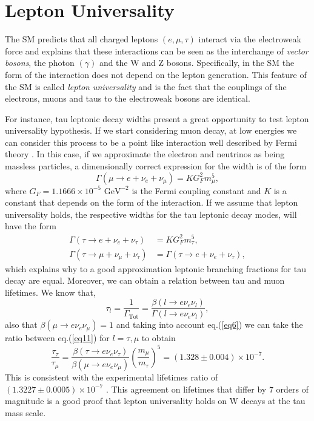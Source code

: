 \section{Lepton Universality}\label{chap2sec2}
The SM predicts that all charged leptons $(e,\mu,\tau)$ interact via the electroweak force and explains that these interactions can be seen as the interchange of \textit{vector bosons}, the photon $(\gamma)$ and the W and Z bosons. Specifically, in the SM the form of the interaction does not depend on the lepton generation. This feature of the SM is called \textit{lepton universality} and is the fact that the couplings of the electrons, muons and taus to the electroweak bosons are identical. 

For instance, tau leptonic decay widths present a great opportunity to test lepton universality hypothesis. If we start considering muon decay, at low energies we can consider this process to be a point like interaction well described by Fermi theory \cite{FermiTheory}. In this case, if we approximate the electron and neutrinos as being massless particles, a dimensionally correct expression for the width is of the form
\begin{equation}
	\Gamma(\mu\to e+\nu_e +\nu_\mu)=KG_{F}^{2}m_{\mu}^{5},
\end{equation} 
where $G_F=1.1666\times 10^{-5} \text{ GeV}^{-2}$ is the Fermi coupling constant and $K$ is a constant that depends on the form of the interaction. If we assume that lepton universality holds, the respective widths for the tau leptonic decay modes, will have the form
\begin{align}
\Gamma(\tau\to e+\nu_e +\nu_\tau)&=KG_{F}^{2}m_{\tau}^{5},
\\
\Gamma(\tau\to \mu+\nu_\mu +\nu_\tau)&=\Gamma(\tau\to e+\nu_e +\nu_\tau),
\end{align}  
which explains why to a good approximation leptonic branching fractions for tau decay are equal. Moreover, we can obtain a relation between tau and muon lifetimes. We know that,
\begin{equation}
	\tau_l=\frac{1}{\Gamma_\text{Tot}}=\frac{\beta(l\to e\nu_e \nu_l)}{\Gamma(l\to e\nu_e \nu_l)},
	\label{eq11}
\end{equation}
also that $\beta(\mu\to e\nu_e \nu_\mu)=1$ and taking into account eq.(\ref{eq6}) we can take the ratio between eq.(\ref{eq11}) for $l=\tau ,\mu$ to obtain
\begin{equation}
\frac{\tau_\tau}{\tau_\mu}=\frac{\beta(\tau\to e\nu_e \nu_\tau)}{\beta(\mu\to e\nu_e \nu_\mu)}\left(\frac{m_\mu}{m_\tau}\right)^5=(1.328\pm 0.004)\times 10^{-7}.
\end{equation}
This is consistent with the experimental lifetimes ratio of $(1.3227\pm 0.0005)\times10^{-7}$ \cite{Martin:1992rg}. This agreement on lifetimes that differ by 7 orders of magnitude is a good proof that lepton universality holds on W decays at the tau mass scale.

